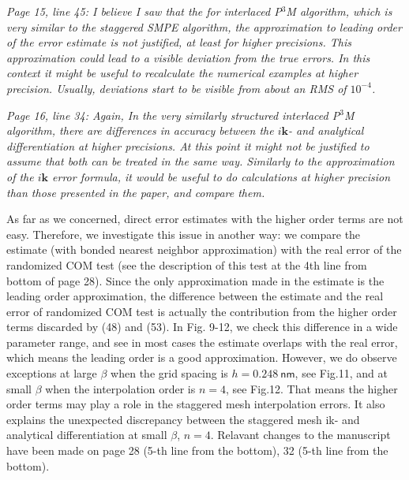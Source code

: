 \documentclass[a4paper]{article}
\begin{document}
\textit{ Page 15, line 45: I believe I saw that the for interlaced
  P$^3$M algorithm, which is very similar to the staggered SMPE
  algorithm, the approximation to leading order of the error estimate
  is not justified, at least for higher precisions. This approximation
  could lead to a visible deviation from the true errors. In this
  context it might be useful to recalculate the numerical examples at
  higher precision. Usually, deviations start to be visible from about
  an RMS of $10^{-4}$.  }

\textit{ Page 16, line 34: Again, In the very similarly structured
  interlaced P$^3$M algorithm, there are differences in accuracy
  between the $i\mathbf{k}$- and analytical differentiation at higher
  precisions. At this point it might not be justified to assume that
  both can be treated in the same way. Similarly to the approximation
  of the $i\mathbf{k}$ error formula, it would be useful to do
  calculations at higher precision than those presented in the paper,
  and compare them. }

As far as we concerned,
direct error estimates with the higher order terms are not easy.
Therefore, we investigate this issue in another way:
we compare the estimate (with bonded nearest neighbor
approximation) with the real error of the randomized COM test
(see the description of this test at the 4th line from bottom of page 28).
Since the only approximation made in the estimate is the leading order
approximation, the difference between the estimate and the real error
of randomized COM test is actually the contribution from the higher
order terms discarded by (48) and (53).
In Fig. 9-12,
we check this difference in a wide parameter range, and see in most
cases the estimate overlaps with the real error, which means
the leading order is a good approximation. 
However,
we do observe exceptions
at large $\beta$ when the grid spacing is $h=0.248\:\textsf{nm}$,
see Fig.11, and
at small $\beta$ when the interpolation order is $n=4$,
see Fig.12.
That means the higher order terms may play a role in the staggered
mesh interpolation errors. It also explains the unexpected discrepancy
between the staggered mesh ik- and analytical differentiation
at small $\beta$, $n=4$.
Relavant changes to the manuscript
have been made on page 28 (5-th line from the bottom), 32 (5-th line from the bottom).
\\


\end{document}
